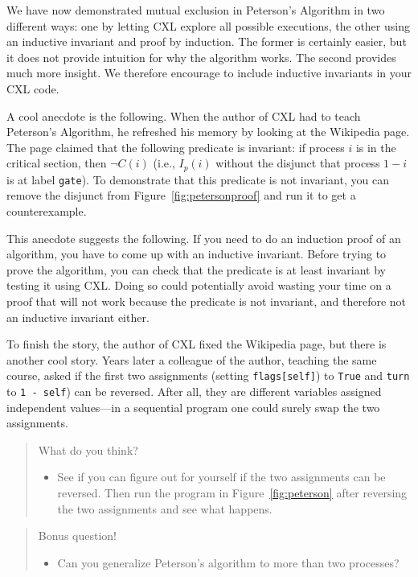 \documentclass{report}
\begin{document}
We have now demonstrated mutual exclusion in Peterson's Algorithm in two
different ways: one by letting CXL explore all possible executions, the
other using an inductive invariant and proof by induction.  The former
is certainly easier, but it does not provide intuition for why the
algorithm works.  The second provides much more insight.  We therefore
encourage to include inductive invariants in your CXL code.

A cool anecdote is the following.  When the author of CXL had to teach
Peterson's Algorithm, he refreshed his memory by looking at the Wikipedia
page.  The page claimed that the following predicate is invariant:
if process $i$ is in the critical section, then $\lnot C(i)$ (i.e.,
$I_p(i)$ without the disjunct that process $1-i$ is at label \texttt{gate}).
To demonstrate that this predicate is not invariant, you can remove the
disjunct from Figure~\ref{fig:petersonproof} and run it to get a
counterexample.

This anecdote suggests the following.  If you need to do an induction
proof of an algorithm, you have to come up with an inductive invariant.
Before trying to prove the algorithm, you can check that the predicate is
at least invariant by testing it using CXL.  Doing so could potentially
avoid wasting your time on a proof that will not work because the
predicate is not invariant, and therefore not an inductive invariant either.

To finish the story, the author of CXL fixed the Wikipedia page, but there
is another cool story.  Years later a colleague of the author, teaching
the same course, asked if the first two assignments (setting \texttt{flags[self]})
to \texttt{True} and \texttt{turn} to \texttt{1 - self}) can be reversed.
After all, they are different variables assigned independent values---in a
sequential program one could surely swap the two assignments.

\begin{quote}
What do you think?
\begin{itemize}
\item See if you can figure out for yourself if the two assignments can be
reversed.  Then run the program in Figure~\ref{fig:peterson} after reversing
the two assignments and see what happens.
\end{itemize}
\end{quote}

\begin{quote}
Bonus question!
\begin{itemize}
\item Can you generalize Peterson's algorithm to more than two processes?
\end{itemize}
\end{quote}
\end{document}
